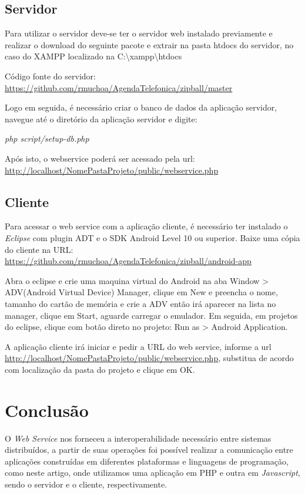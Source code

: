 \documentclass{acm_proc_article-sp}
\begin{document}
	\subsection{Servidor}
	
		Para utilizar o servidor deve-se ter o servidor web instalado previamente e realizar o download do seguinte pacote e extrair na pasta htdocs do servidor, no caso do XAMPP localizado na C:\textbackslash xampp\textbackslash htdocs
	
		Código fonte do servidor: \url{https://github.com/rmuchoa/AgendaTelefonica/zipball/master}
		
		Logo em seguida, é necessário criar o banco de dados da aplicação servidor, navegue até o diretório da aplicação servidor e digite: 
		
			\emph{php script/setup-db.php}
		
		Após isto, o webservice poderá ser acessado pela url: \url{http://localhost/NomePastaProjeto/public/webservice.php}
	
	\subsection{Cliente}
	
		Para acessar o web service com a aplicação cliente, é necessário ter instalado o \emph{Eclipse} com plugin ADT e o SDK Android Level 10 ou superior. Baixe uma cópia do cliente na URL: \url{https://github.com/rmuchoa/AgendaTelefonica/zipball/android-app}

		Abra o eclipse e crie uma maquina virtual do Android na aba Window > ADV(Android Virtual Device) Manager, clique em New e preencha o nome, tamanho do cartão de memória e crie a ADV então irá aparecer na lista no manager, clique em Start, aguarde carregar o emulador. Em seguida, em projetos do eclipse, clique com botão direto no projeto: Run as > Android Application. 
		
		A aplicação cliente irá iniciar e pedir a URL do web service, informe a url \url{http://localhost/NomePastaProjeto/public/webservice.php}, substitua de acordo com localização da pasta do projeto e clique em OK.
	
		
	
\section{Conclusão}

	O \emph{Web Service} nos forneceu a interoperabilidade necessário entre sistemas distribuídos, a partir de suas operações foi possível realizar a comunicação entre aplicações construídas em diferentes plataformas e linguagens de programação, como neste artigo, onde utilizamos uma aplicação em PHP e outra em \emph{Javascript}, sendo o servidor e o cliente, respectivamente. 
	
	
 

\end{document}
